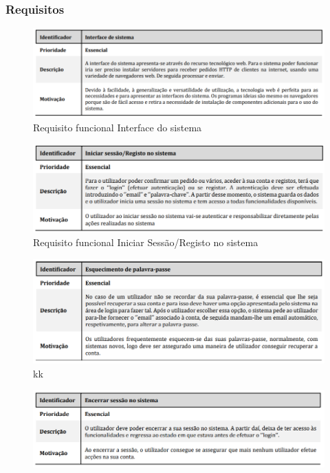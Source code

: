 \subsubsection{Requisitos}
\begin{figure}[H]
	\centering
	\includegraphics{requisito_funcional1}
	\caption{Requisito funcional Interface do sistema}
	\label{fig:requisitofuncional1}
\end{figure}

\begin{figure}[H]
	\centering
	\includegraphics{requisito_funcional2}
	\caption{Requisito funcional Iniciar Sessão/Registo no sistema}
	\label{fig:requisitofuncional2}
\end{figure}

\begin{figure}[H]
	\centering
	\includegraphics{requisito_funcional3}
	\caption{kk}
	\label{fig:requisitofuncional3}
\end{figure}

\begin{figure}[H]
	\centering
	\includegraphics{requisito_funcional4}
	\caption{}
	\label{fig:requisitofuncional4}
\end{figure}


